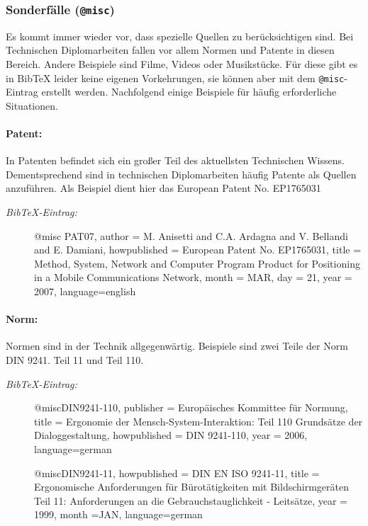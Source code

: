 \subsubsection{Sonderfälle (\texttt{@misc})}

Es kommt immer wieder vor, dass spezielle
Quellen zu berücksichtigen sind. Bei Technischen Diplomarbeiten fallen
vor allem Normen und Patente in diesen Bereich. Andere Beispiele sind
Filme, Videos oder Musikstücke. Für diese gibt es in BibTeX leider keine eigenen Vorkehrungen, sie können aber mit dem \texttt{@misc}-Eintrag
erstellt werden. Nachfolgend einige Beispiele für häufig
erforderliche Situationen.

\paragraph{Patent:} In Patenten befindet sich ein großer Teil des aktuellsten
Technischen Wissens. Dementsprechend sind in technischen Diplomarbeiten häufig
Patente als Quellen anzuführen. Als Beispiel dient hier das European Patent No.
EP1765031 \cite{PAT07}

%
\begin{description}
\item[\it BibTeX-Eintrag:] \mbox{} \par 
\begin{GenericCode}
@misc {PAT07,
    author = {M. Anisetti and {C.A.} Ardagna and V. Bellandi and E. Damiani},
    howpublished = {European Patent No. EP1765031},
    title = {Method, System, Network and Computer Program Product for Positioning in a Mobile Communications Network},
    month = MAR,
    day = {21},
    year = {2007},
    language={english}
} 
\end{GenericCode}
\end{description}

\paragraph{Norm:} Normen sind in der Technik allgegenwärtig. Beispiele sind zwei
Teile der Norm DIN 9241. Teil 11\cite{DIN9241-11} und Teil
110\cite{DIN9241-110}.

\begin{description}
\item[\it BibTeX-Eintrag:] \mbox{} \par 
\begin{GenericCode}
@misc{DIN9241-110,
  publisher = {Europäisches Kommittee für Normung},
  title = {Ergonomie der Mensch-System-Interaktion: Teil 110 Grundsätze der Dialoggestaltung},
  howpublished = {DIN 9241-110},
  year = 2006,
  language={german}
}

@misc{DIN9241-11,
  howpublished = {DIN EN ISO 9241-11},
  title = {Ergonomische Anforderungen für Bürotätigkeiten mit Bildschirmgeräten 
Teil 11: Anforderungen an die Gebrauchstauglichkeit - Leitsätze},
  year = 1999,
  month =JAN,
  language={german}
}
\end{GenericCode}
\end{description}

